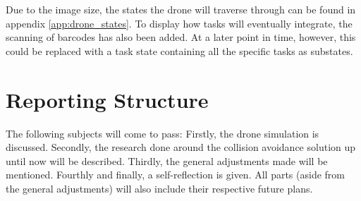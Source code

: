 \noindent
Due to the image size, the states the drone will traverse through can be found in appendix \ref{app:drone_states}. To display how tasks will eventually integrate, the scanning of barcodes has also been added. At a later point in time, however, this could be replaced with a task state containing all the specific tasks as substates.
\section{Reporting Structure}
\label{sec:structure}
The following subjects will come to pass: Firstly, the drone simulation is discussed. Secondly, the research done around the collision avoidance solution up until now will be described. Thirdly, the general adjustments made will be mentioned. Fourthly and finally, a self-reflection is given. All parts (aside from the general adjustments) will also include their respective future plans.